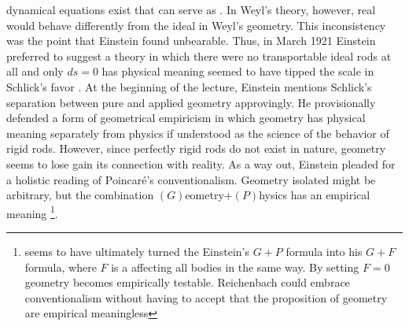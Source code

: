 \documentclass[draft]{article}
\newcommand{\WT}{Weyl's theory\xspace}
\newcommand{\WG}{Weyl's geometry\xspace}
\begin{document}
{dynamical equations exist that can serve as \rac. In \WT, however, real \rac would behave differently from the ideal \rac in \WG. This inconsistency was the point that Einstein found unbearable. Thus, in March 1921 Einstein preferred to suggest a theory in which there were no transportable ideal rods at all and only $ds=0$ has physical meaning \citep{Einstein1921c}} seemed to have tipped the scale in Schlick's favor \citep[5]{Reichenbach1921a}. At the beginning of the lecture, Einstein mentions Schlick's separation between pure and applied geometry approvingly.  He provisionally defended a form of geometrical empiricism in which geometry has physical meaning separately from physics if understood as the science of the behavior of rigid rods. However, since perfectly rigid rods do not exist in nature, geometry seems to lose gain its connection with reality. As a way out, Einstein pleaded for a holistic reading of Poincaré's conventionalism. Geometry isolated might be arbitrary, but the combination $(G)$eometry+$(P)$hysics has an empirical meaning \citep[5]{Reichenbach1921a}\footnote{\citet{Reichenbach1922a} seems to have ultimately turned the Einstein's $G+P$ formula into his $G + F$ formula, where $F$ is a  affecting all bodies in the same way. By setting $F=0$ geometry becomes empirically testable. Reichenbach could embrace conventionalism without having to accept that the proposition of geometry are empirical meaningless}.










\end{document}
